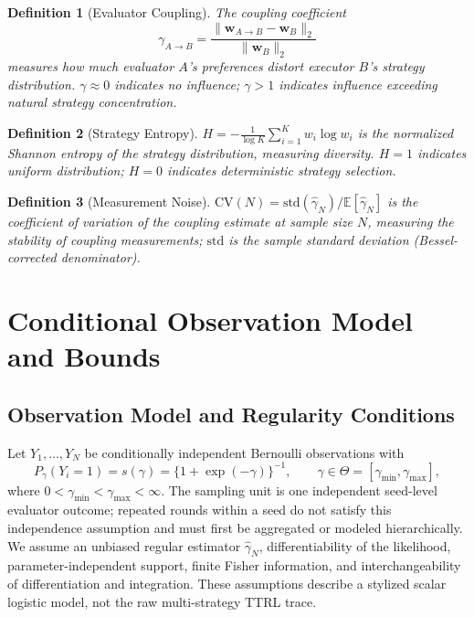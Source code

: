 \documentclass[11pt]{article}
\newtheorem{definition}{Definition}
\begin{document}
\begin{definition}[Evaluator Coupling]
The coupling coefficient
\[
\gamma_{A \to B} =
\frac{\|\mathbf{w}_{A \to B} - \mathbf{w}_B\|_2}{\|\mathbf{w}_B\|_2}
\]
measures how much evaluator $A$'s preferences distort executor $B$'s strategy distribution. $\gamma \approx 0$ indicates no influence; $\gamma > 1$ indicates influence exceeding natural strategy concentration.
\end{definition}

\begin{definition}[Strategy Entropy]
$H = -\frac{1}{\log K}\sum_{i=1}^K w_i \log w_i$ is the normalized Shannon entropy of the strategy distribution, measuring diversity. $H = 1$ indicates uniform distribution; $H = 0$ indicates deterministic strategy selection.
\end{definition}

\begin{definition}[Measurement Noise]
$\mathrm{CV}(N) = \text{std}(\hat{\gamma}_N) / \mathbb{E}[\hat{\gamma}_N]$ is the coefficient of variation of the coupling estimate at sample size $N$, measuring the stability of coupling measurements; $\text{std}$ is the sample standard deviation (Bessel-corrected denominator).
\end{definition}

\section{Conditional Observation Model and Bounds}

\subsection{Observation Model and Regularity Conditions}

Let $Y_1,\ldots,Y_N$ be conditionally independent Bernoulli observations with
\[
P_\gamma(Y_i=1)=s(\gamma)=\{1+\exp(-\gamma)\}^{-1},
\qquad \gamma\in\Theta=[\gamma_{\min},\gamma_{\max}],
\]
where $0<\gamma_{\min}<\gamma_{\max}<\infty$. The sampling unit is one independent seed-level evaluator outcome; repeated rounds within a seed do not satisfy this independence assumption and must first be aggregated or modeled hierarchically. We assume an unbiased regular estimator $\hat\gamma_N$, differentiability of the likelihood, parameter-independent support, finite Fisher information, and interchangeability of differentiation and integration. These assumptions describe a stylized scalar logistic model, not the raw multi-strategy TTRL trace.
\end{document}
